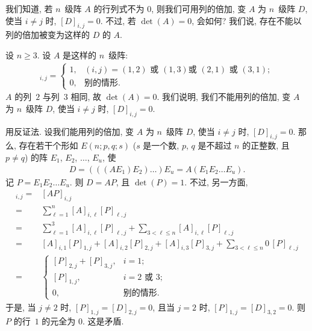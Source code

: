 \documentclass[../libro.tex]{subfiles}
\begin{document}
\begin{example}
    我们知道, 若 \(n\)~级阵 \(A\) 的行列式不为 \(0\),
    则我们可用列的倍加,
    变 \(A\) 为 \(n\)~级阵 \(D\),
    使当 \(i \neq j\) 时, \([D]_{i,j} = 0\).
    不过, 若 \(\det {(A)} = 0\), 会如何?
    我们说, 存在不能以列的倍加被变为这样的 \(D\) 的 \(A\).

    设 \(n \geq 3\).
    设 \(A\) 是这样的 \(n\)~级阵:
    \begin{align*}
        [A]_{i,j} =
        \begin{cases}
            1,
            & \text{\((i,j) = (1,2)\) 或 \((1,3)\)
            或 \((2,1)\) 或 \((3,1)\)}; \\
            0,
            & \text{别的情形}.
        \end{cases}
    \end{align*}
    \(A\) 的列~\(2\) 与列~\(3\) 相同,
    故 \(\det {(A)} = 0\).
    我们说明, 我们不能用列的倍加,
    变 \(A\) 为 \(n\)~级阵 \(D\),
    使当 \(i \neq j\) 时, \([D]_{i,j} = 0\).

    用反证法.
    设我们能用列的倍加,
    变 \(A\) 为 \(n\)~级阵 \(D\),
    使当 \(i \neq j\) 时, \([D]_{i,j} = 0\).
    那么, 存在若干个形如
    \(E(n; p, q; s)\)
    (\(s\) 是一个数, %
    \(p\), \(q\) 是不超过 \(n\) 的正整数,
    且 \(p \neq q\)) %
    的阵
    \(E_1\), \(E_2\), \(\dots\), \(E_u\),
    使
    \begin{align*}
        D = (((A E_1) E_2) \dots) E_u
        = A (E_1 E_2 \dots E_u).
    \end{align*}
    记 \(P = E_1 E_2 \dots E_u\).
    则 \(D = A P\), 且 \(\det {(P)} = 1\).
    不过, 另一方面,
    \begin{align*}
        [D]_{i,j}
        = {} &
        [A P]_{i,j}
        \\
        = {} &
        \sum_{\ell = 1}^{n} {[A]_{i,\ell} [P]_{\ell,j}}
        \\
        = {} &
        \sum_{\ell = 1}^{3} {[A]_{i,\ell} [P]_{\ell,j}}
        + \sum_{3 < \ell \leq n} {[A]_{i,\ell} [P]_{\ell,j}}
        \\
        = {} &
        [A]_{i,1} [P]_{1,j}
        + [A]_{i,2} [P]_{2,j}
        + [A]_{i,3} [P]_{3,j}
        + \sum_{3 < \ell \leq n} {0\, [P]_{\ell,j}}
        \\
        = {} &
        \begin{cases}
            [P]_{2,j} + [P]_{3,j}, & i = 1;                    \\
            [P]_{1,j},             & \text{\(i = 2\) 或 \(3\)}; \\
            0,                     & \text{别的情形}.
        \end{cases}
    \end{align*}
    于是, 当 \(j \neq 2\) 时,
    \([P]_{1,j} = [D]_{2,j} = 0\),
    且当 \(j = 2\) 时,
    \([P]_{1,j} = [D]_{3,2} = 0\).
    则 \(P\) 的行~\(1\) 的元全为 \(0\).
    这是矛盾.


\end{example}
\end{document}
